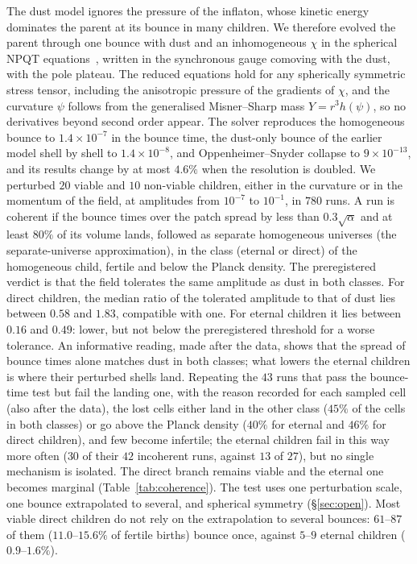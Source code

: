 \documentclass[11pt,a4paper]{article}
\begin{document}
The dust model ignores the pressure of the inflaton, whose kinetic energy dominates the parent at its bounce in many children.
We therefore evolved the parent through one bounce with dust and an inhomogeneous $\chi$ in the spherical NPQT equations~\cite{Bueno2025formation}, written in the synchronous gauge comoving with the dust, with the pole plateau. The reduced equations hold for any spherically symmetric stress tensor, including the anisotropic pressure of the gradients of $\chi$, and the curvature $\psi$ follows from the generalised Misner--Sharp mass $Y=r^3h(\psi)$, so no derivatives beyond second order appear.
The solver reproduces the homogeneous bounce to $1.4\times10^{-7}$ in the bounce time, the dust-only bounce of the earlier model shell by shell to $1.4\times10^{-8}$, and Oppenheimer--Snyder collapse to $9\times10^{-13}$, and its results change by at most $4.6\%$ when the resolution is doubled.
We perturbed $20$ viable and $10$ non-viable children, either in the curvature or in the momentum of the field, at amplitudes from $10^{-7}$ to $10^{-1}$, in $780$ runs.
A run is coherent if the bounce times over the patch spread by less than $0.3\sqrt{\alpha}$ and at least $80\%$ of its volume lands, followed as separate homogeneous universes (the separate-universe approximation), in the class (eternal or direct) of the homogeneous child, fertile and below the Planck density.
The preregistered verdict is that the field tolerates the same amplitude as dust in both classes.
For direct children, the median ratio of the tolerated amplitude to that of dust lies between $0.58$ and $1.83$, compatible with one.
For eternal children it lies between $0.16$ and $0.49$: lower, but not below the preregistered threshold for a worse tolerance.
An informative reading, made after the data, shows that the spread of bounce times alone matches dust in both classes; what lowers the eternal children is where their perturbed shells land. Repeating the $43$ runs that pass the bounce-time test but fail the landing one, with the reason recorded for each sampled cell (also after the data), the lost cells either land in the other class ($45\%$ of the cells in both classes) or go above the Planck density ($40\%$ for eternal and $46\%$ for direct children), and few become infertile; the eternal children fail in this way more often ($30$ of their $42$ incoherent runs, against $13$ of $27$), but no single mechanism is isolated.
The direct branch remains viable and the eternal one becomes marginal (Table~\ref{tab:coherence}).
The test uses one perturbation scale, one bounce extrapolated to several, and spherical symmetry (\S\ref{sec:open}).
Most viable direct children do not rely on the extrapolation to several bounces: $61$--$87$ of them ($11.0$--$15.6\%$ of fertile births) bounce once, against $5$--$9$ eternal children ($0.9$--$1.6\%$).
\end{document}
